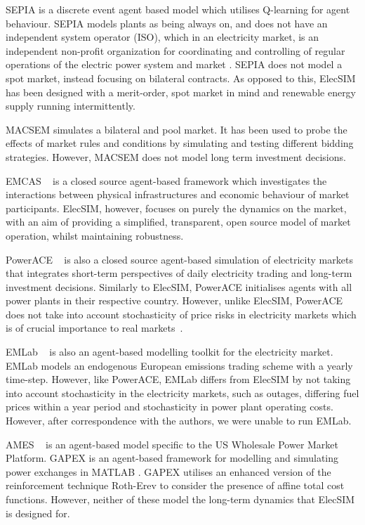 SEPIA \cite{Harp2000} is a discrete event agent based model which utilises Q-learning for agent behaviour. SEPIA models plants as being always on, and does not have an independent system operator (ISO), which in an electricity market, is an independent non-profit organization for coordinating and controlling of regular operations of the electric power system and market  \cite{Zhou2007}. SEPIA does not model a spot market, instead focusing on bilateral contracts. As opposed to this, ElecSIM has been designed with a merit-order, spot market in mind and renewable energy supply running intermittently.

MACSEM \cite{Praca2003} simulates a bilateral and pool market. It has been used to probe the effects of market rules and conditions by simulating and testing different bidding strategies. However, MACSEM does not model long term investment decisions.

EMCAS ~\cite{Conzelmann} is a closed source agent-based framework which investigates the interactions between physical infrastructures and economic behaviour of market participants. ElecSIM, however, focuses on purely the dynamics on the market, with an aim of providing a simplified, transparent, open source model of market operation, whilst maintaining robustness.

PowerACE ~\cite{Rothengatter2007} is also a closed source agent-based simulation of electricity markets that integrates short-term perspectives of daily electricity trading and long-term investment decisions. Similarly to ElecSIM, PowerACE initialises agents with all power plants in their respective country. However, unlike ElecSIM, PowerACE does not take into account stochasticity of price risks in electricity markets which is of crucial importance to real markets~\cite{Most2010}.

EMLab ~\cite{Chappin2017} is also an agent-based modelling toolkit for the electricity market. EMLab models an endogenous European emissions trading scheme with a yearly time-step. However, like PowerACE, EMLab differs from ElecSIM by not taking into account stochasticity in the electricity markets, such as outages, differing fuel prices within a year period and stochasticity in power plant operating costs. However, after correspondence with the authors, we were unable to run EMLab.

AMES ~\cite{Sun2007} is an agent-based model specific to the US Wholesale Power Market Platform. GAPEX \cite{Cincotti2013} is an agent-based framework for modelling and simulating power exchanges in MATLAB . GAPEX utilises an enhanced version of the reinforcement technique Roth-Erev to consider the presence of affine total cost functions. However, neither of these model the long-term dynamics that ElecSIM is designed for.

